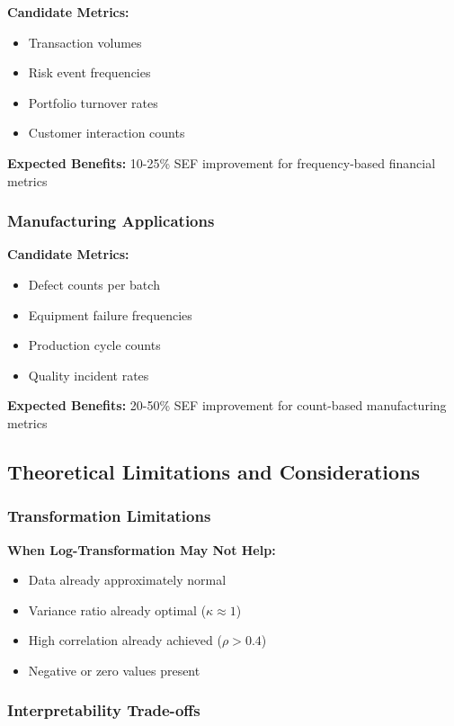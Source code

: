 \textbf{Candidate Metrics:}
\begin{itemize}
    \item Transaction volumes
    \item Risk event frequencies
    \item Portfolio turnover rates
    \item Customer interaction counts
\end{itemize}

\textbf{Expected Benefits:} 10-25\% SEF improvement for frequency-based financial metrics

\subsubsection{Manufacturing Applications}

\textbf{Candidate Metrics:}
\begin{itemize}
    \item Defect counts per batch
    \item Equipment failure frequencies
    \item Production cycle counts
    \item Quality incident rates
\end{itemize}

\textbf{Expected Benefits:} 20-50\% SEF improvement for count-based manufacturing metrics

\subsection{Theoretical Limitations and Considerations}

\subsubsection{Transformation Limitations}

\textbf{When Log-Transformation May Not Help:}
\begin{itemize}
    \item Data already approximately normal
    \item Variance ratio already optimal ($\kappa \approx 1$)
    \item High correlation already achieved ($\rho > 0.4$)
    \item Negative or zero values present
\end{itemize}

\subsubsection{Interpretability Trade-offs}

